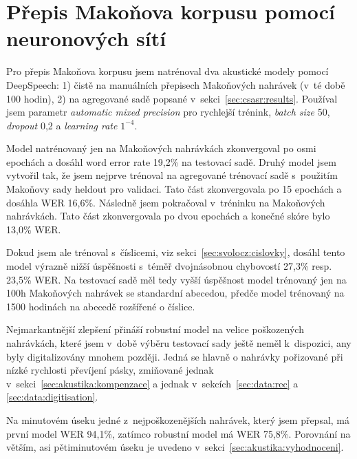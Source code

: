 %

\section{Přepis Makoňova korpusu pomocí neuronových sítí}
\label{sec:deepspeech}

Pro přepis Makoňova korpusu jsem natrénoval dva akustické modely pomocí DeepSpeech:
1) čistě na manuálních přepisech
Makoňových nahrávek (v~té době 100 hodin), 2) na agregované sadě popsané
v~sekci~\ref{sec:csasr:results}. Používal jsem parametr \textit{automatic mixed
precision} pro rychlejší trénink, \textit{batch size} 50, \textit{dropout} 0,2 a
\textit{learning rate} $1^{-4}$.

Model natrénovaný jen na Makoňových nahrávkách zkonvergoval po osmi epochách a
dosáhl word error rate 19,2\% na testovací sadě. Druhý model jsem vytvořil tak,
že jsem nejprve trénoval na agregované trénovací sadě s~použitím Makoňovy
sady heldout pro validaci. Tato část zkonvergovala po 15 epochách a dosáhla WER
16,6\%. Následně jsem pokračoval v~tréninku na Makoňových nahrávkách. Tato část
zkonvergovala po dvou epochách a konečné skóre bylo 13,0\% WER.

Dokud jsem ale trénoval s~číslicemi, viz sekci~\ref{sec:svolocz:cislovky},
dosáhl tento model výrazně nižší úspěšnosti s~téměř dvojnásobnou chybovostí
27,3\% resp. 23,5\% WER.
Na testovací sadě měl tedy vyšší úspěšnost model trénovaný jen na 100h Makoňových
nahrávek se standardní abecedou, předče model trénovaný na 1500 hodinách na
abecedě rozšířené o číslice.


Nejmarkantnější zlepšení přináší robustní model na velice poškozených nahrávkách, které jsem
v~době výběru testovací sady ještě neměl k~dispozici, any byly digitalizovány
mnohem později. Jedná se hlavně o nahrávky pořizované při nízké rychlosti
převíjení pásky, zmiňované jednak v~sekci~\ref{sec:akustika:kompenzace} a jednak
v~sekcích~\ref{sec:data:rec} a \ref{sec:data:digitisation}.

Na minutovém úseku jedné z~nejpoškozenějších nahrávek, který jsem
přepsal, má první model WER 94,1\%, zatímco robustní model má WER
75,8\%. Porovnání na větším, asi pětiminutovém úseku je uvedeno
v~sekci~\ref{sec:akustika:vyhodnoceni}.

